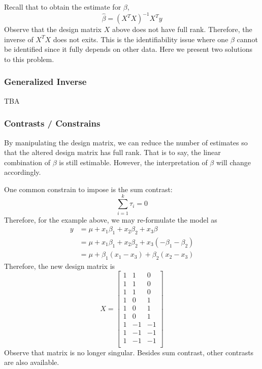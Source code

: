 \documentclass[9pt]{article}
\begin{document}
Recall that to obtain the estimate for $\beta$,
$$
\hat \beta = (X^TX)^{-1}X^Ty
$$
Observe that the design matrix $X$ above does not have full rank. Therefore, the inverse of $X^TX$ does not exits. This is the identifiability issue where one $\beta$ cannot be identified since it fully depends on other data. Here we present two solutions to this problem.

\subsubsection{Generalized Inverse}
TBA

\subsubsection{Contrasts / Constrains}
By manipulating the design matrix, we can reduce the number of estimates so that the altered design matrix has full rank. That is to say, the linear combination of $\beta$ is still estimable. However, the interpretation of  $\beta$ will change accordingly.\par

One common constrain to impose is the sum contrast:
$$
\sum_{i=1}^{k}\tau_i = 0
$$
Therefore, for the example above, we may re-formulate the model as
\begin{align*}
    y &= \mu  + x_1\beta_1 + x_2\beta_2 + x_3\beta\\
    &= \mu + x_1\beta_1 + x_2\beta_2 + x_3(-\beta_1-\beta_2)\\
    &= \mu + \beta_1(x_1-x_3) + \beta_2(x_2-x_3)
\end{align*}
Therefore, the new design matrix is
$$
X = \begin{bmatrix}
    1 & 1 & 0\\
    1 & 1 & 0\\
    1 & 1 & 0\\
    1 & 0 & 1\\
    1 & 0 & 1\\
    1 & 0 & 1\\
    1 & -1 & -1\\
    1 & -1 & -1\\
    1 & -1 & -1\\
\end{bmatrix}
$$
Observe that matrix is no longer singular. Besides sum contrast, other contrasts are also available. 
\end{document}
